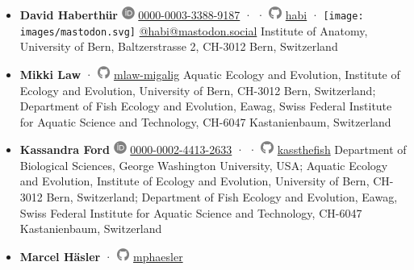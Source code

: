 \begin{itemize}
\item
  \textbf{David Haberthür}
  \includegraphics[width=0.16667in,height=0.16667in]{images/orcid.svg}
  \href{https://orcid.org/0000-0003-3388-9187}{0000-0003-3388-9187} ·
  · \includegraphics[width=0.16667in,height=0.16667in]{images/github.svg}
  \href{https://github.com/habi}{habi}
  · \texttt{[image: images/mastodon.svg]}
  \href{https://mastodon.social/@habi}{@habi@mastodon.social}
  Institute of Anatomy, University of Bern, Baltzerstrasse 2, CH-3012 Bern, Switzerland
\item
  \textbf{Mikki Law}
  · \includegraphics[width=0.16667in,height=0.16667in]{images/github.svg}
  \href{https://github.com/mlaw-migalig}{mlaw-migalig}
  Aquatic Ecology and Evolution, Institute of Ecology and Evolution, University of Bern, CH-3012 Bern, Switzerland; Department of Fish Ecology and Evolution, Eawag, Swiss Federal Institute for Aquatic Science and Technology, CH-6047 Kastanienbaum, Switzerland
\item
  \textbf{Kassandra Ford}
  \includegraphics[width=0.16667in,height=0.16667in]{images/orcid.svg}
  \href{https://orcid.org/0000-0002-4413-2633}{0000-0002-4413-2633} ·
  · \includegraphics[width=0.16667in,height=0.16667in]{images/github.svg}
  \href{https://github.com/kassthefish}{kassthefish}
  Department of Biological Sciences, George Washington University, USA; Aquatic Ecology and Evolution, Institute of Ecology and Evolution, University of Bern, CH-3012 Bern, Switzerland; Department of Fish Ecology and Evolution, Eawag, Swiss Federal Institute for Aquatic Science and Technology, CH-6047 Kastanienbaum, Switzerland
\item
  \textbf{Marcel Häsler}
  · \includegraphics[width=0.16667in,height=0.16667in]{images/github.svg}
  \href{https://github.com/mphaesler}{mphaesler}

\end{itemize}
